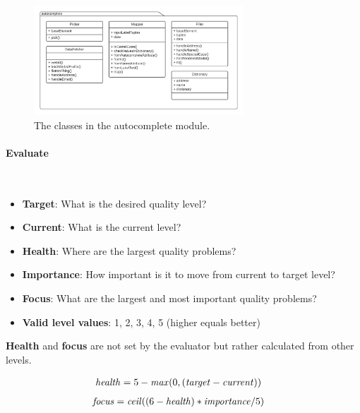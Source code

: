 \begin{figure}[H]
    \centering
    \includegraphics[width=0.7\textwidth]{prototype/graphs/poc-autocomplete-package.png}
    \caption{The classes in the autocomplete module.}
    \label{fig:poc-autocomplete-package}
\end{figure}
\vspace{0.5cm}
\paragraph{Evaluate}\mbox{}\\

\begin{itemize}
    \item \textbf{Target}: What is the desired quality level?
    \item \textbf{Current}: What is the current level?
    \item \textbf{Health}: Where are the largest quality problems?
    \item \textbf{Importance}: How important is it to move from current to target level?
    \item \textbf{Focus}: What are the largest and most important quality problems?
    \item \textbf{Valid level values}: 1, 2, 3, 4, 5 (higher equals better)
\end{itemize}

\textbf{Health} and \textbf{focus} are not set by the evaluator but rather calculated from other levels.

\begin{align*}
    \text{\textit{health}}&=5 - \text{\textit{max}}(0, (\text{\textit{target}} - \text{\textit{current}}))
\end{align*}
\vspace{-5mm}
\begin{align*}
    \text{\textit{focus}}&= \text{\textit{ceil}}((6 - \text{\textit{health}}) * \text{\textit{importance}}/5)
\end{align*}

